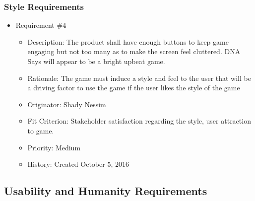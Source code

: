 \documentclass[12pt, titlepage]{article}
\begin{document}
\subsubsection{Style Requirements}
\begin{itemize} 

\item Requirement \#4 
\begin{itemize} 
\item Description: The product shall have enough buttons to keep game engaging but not too many as to make the screen feel cluttered. DNA Says will appear to be a bright upbeat game. 
\item Rationale: The game must induce a style and feel to the user that will be a driving factor to use the game if the user likes the style of the game
\item Originator: Shady Nessim 
\item Fit Criterion: Stakeholder satisfaction regarding the style, user attraction to game. 
\item Priority: Medium 
\item History: Created October 5, 2016
\end{itemize}

\end{itemize}

\subsection{Usability and Humanity Requirements}
\end{document}
